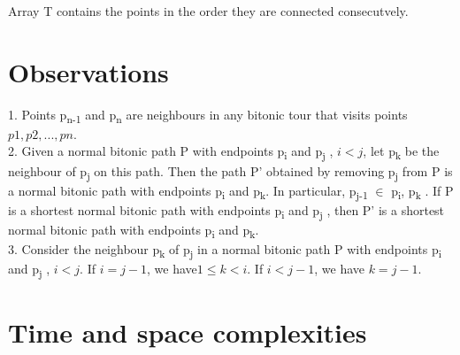 \documentclass{article}
\begin{document}
Array T contains the points in the order they are connected consecutvely.\\
  
  \section{Observations}
  1. Points p\textsubscript{n-1} and p\textsubscript{n} are neighbours in any bitonic tour that visits points $p1, p2, . . . , pn$.\\
  2. Given a normal bitonic path P with endpoints p\textsubscript{i} and p\textsubscript{j} , $i < j$, let p\textsubscript{k} be the neighbour of p\textsubscript{j} on this path. Then the path P' obtained by removing p\textsubscript{j} from P is a normal bitonic path with endpoints p\textsubscript{i} and p\textsubscript{k}. In particular, p\textsubscript{j-1} $∈$ {p\textsubscript{i}, p\textsubscript{k} }. If P is a shortest normal bitonic path with endpoints p\textsubscript{i} and p\textsubscript{j} , then P' is a shortest normal bitonic path with endpoints p\textsubscript{i} and p\textsubscript{k}.\\
  3. Consider the neighbour p\textsubscript{k} of p\textsubscript{j} in a normal bitonic path P with endpoints p\textsubscript{i} and p\textsubscript{j} , $i < j$. If $i=j-1$, we have$ 1 \leq k < i$. If $i < j - 1$, we have $k = j-1$.\\

   
   
  \section{Time and space complexities}
  
\end{document}
